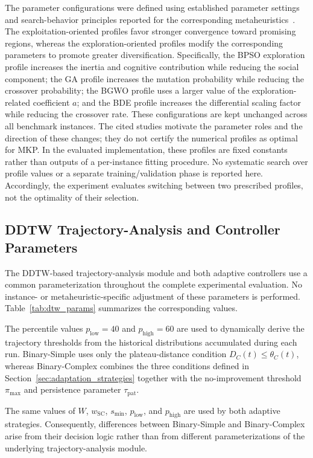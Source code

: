 \documentclass[mathematics,article,accept,moreauthors]{Definitions/mdpi}
\begin{document}
The parameter configurations were defined using established parameter
settings and search-behavior principles reported for the corresponding
metaheuristics~\cite{clerc2002particle,goldberg1989genetic,
mirjalili2014grey,storn1997differential}. The exploitation-oriented profiles
favor stronger convergence toward promising regions, whereas the
exploration-oriented profiles modify the corresponding parameters to promote
greater diversification. Specifically, the BPSO exploration profile increases
the inertia and cognitive contribution while reducing the social component;
the GA profile increases the mutation probability while reducing the
crossover probability; the BGWO profile uses a larger value of the
exploration-related coefficient $a$; and the BDE profile increases the
differential scaling factor while reducing the crossover rate. These
configurations are kept unchanged across all benchmark instances. The
cited studies motivate the parameter roles and the direction of these
changes; they do not certify the numerical profiles as optimal for MKP.
In the evaluated implementation, these profiles are fixed constants rather
than outputs of a per-instance fitting procedure. No systematic search over
profile values or a separate training/validation phase is reported here.
Accordingly, the experiment evaluates switching between two prescribed
profiles, not the optimality of their selection.


\subsection{DDTW Trajectory-Analysis and Controller Parameters}
\label{sec:dtw_config}

The DDTW-based trajectory-analysis module and both adaptive controllers use
a common parameterization throughout the complete experimental evaluation.
No instance- or metaheuristic-specific adjustment of these parameters is
performed. Table~\ref{tab:dtw_params} summarizes the corresponding values.

The percentile values $p_{\mathrm{low}}=40$ and
$p_{\mathrm{high}}=60$ are used to dynamically derive the trajectory
thresholds from the historical distributions accumulated during each run.
Binary-Simple uses only the plateau-distance condition
$D_C(t)\leq\theta_C(t)$, whereas Binary-Complex combines the three conditions
defined in Section~\ref{sec:adaptation_strategies} together with the
no-improvement threshold $\pi_{\max}$ and persistence parameter
$\tau_{\mathrm{pat}}$.

The same values of $W$, $w_{\mathrm{SC}}$, $s_{\min}$,
$p_{\mathrm{low}}$, and $p_{\mathrm{high}}$ are used by both adaptive
strategies. Consequently, differences between Binary-Simple and
Binary-Complex arise from their decision logic rather than from different
parameterizations of the underlying trajectory-analysis module.
\end{document}
